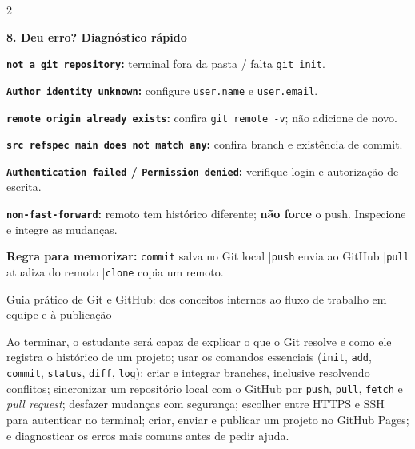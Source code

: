 \documentclass[11pt,a4paper]{article}
\newcommand{\cheatsect}[2]{\textbf{\fontsize{8.6}{9.8}\selectfont\color{#1}#2}\par\vspace{0.5mm}}
\newcommand{\cheatnote}[1]{{\fontsize{7.8}{9}\selectfont#1}\par}
\begin{document}
\begin{multicols}{2}
\begin{tcolorbox}[cheatalert]
\cheatsect{AlertMuted}{8. Deu erro? Diagnóstico rápido}
\cheatnote{\textbf{\texttt{not a git repository}:} terminal fora da pasta / falta \texttt{git init}.}
\cheatnote{\textbf{\texttt{Author identity unknown}:} configure \texttt{user.name} e \texttt{user.email}.}
\cheatnote{\textbf{\texttt{remote origin already exists}:} confira \texttt{git remote -v}; não adicione de novo.}
\cheatnote{\textbf{\texttt{src refspec main does not match any}:} confira branch e existência de commit.}
\cheatnote{\textbf{\texttt{Authentication failed} / \texttt{Permission denied}:} verifique login e autorização de escrita.}
\cheatnote{\textbf{\texttt{non-fast-forward}:} remoto tem histórico diferente; \textbf{não force} o push. Inspecione e integre as mudanças.}
\end{tcolorbox}
\end{multicols}

\vspace{1mm}
{\small\color{PrimaryBlue}\textbf{Regra para memorizar:} \texttt{commit} salva no Git local \quad|\quad \texttt{push} envia ao GitHub \quad|\quad \texttt{pull} atualiza do remoto \quad|\quad \texttt{clone} copia um remoto.}\par
\endgroup

\vspace{4mm}

\begin{center}
{\large Guia prático de Git e GitHub: dos conceitos internos ao fluxo de trabalho em equipe e à publicação}
\end{center}

\begin{tcolorbox}[title={OBJETIVO DA AULA}]
Ao terminar, o estudante será capaz de explicar o que o Git resolve e como ele registra o histórico de um projeto; usar os comandos essenciais (\texttt{init}, \texttt{add}, \texttt{commit}, \texttt{status}, \texttt{diff}, \texttt{log}); criar e integrar branches, inclusive resolvendo conflitos; sincronizar um repositório local com o GitHub por \texttt{push}, \texttt{pull}, \texttt{fetch} e \textit{pull request}; desfazer mudanças com segurança; escolher entre HTTPS e SSH para autenticar no terminal; criar, enviar e publicar um projeto no GitHub Pages; e diagnosticar os erros mais comuns antes de pedir ajuda.
\end{tcolorbox}
\end{document}
